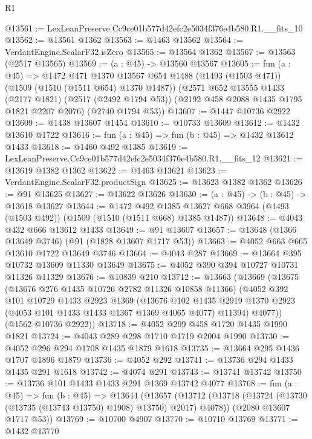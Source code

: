 \begin{lexlean}{R1}
\begin{coremodule}
@13561 := LexLeanPreserve.Cc9ce01b577d42efc2e5034f376e4b580.R1.__fits_10
@13562 := @13561 @1362
@13563 := @1463 @13562
@13564 := VerdantEngine.ScalarF32.isZero
@13565 := @13564 @1362
@13567 := @13563 (@2517 @13565)
@13569 := (a : @45) -> @13560 @13567
@13605 := fun (a : @45) =>
  @1472
    @471
    @1370
    @13567
    @654
    @1488
    (@1493 (@1503 @471))
    (@1509 (@1510 (@1511 @654) @1370 @1487))
    (@2571
      @652
      @13555
      @1433
      (@2177 @1821)
      (@2517 (@2492 @1794 @53))
      (@2192 @458 @2088 @1435 @1795 @1821 @2207 @2076)
      (@2740 @1794 @53))
@13607 := @1447 @10736 @2922
@13609 := @1438 @13607 @1454
@13610 := @10733 @13609
@13612 := @1432 @13610 @1722
@13616 := fun (a : @45) => fun (b : @45) => @1432 @13612 @1433
@13618 := @1460 @492 @1385
@13619 := LexLeanPreserve.Cc9ce01b577d42efc2e5034f376e4b580.R1.__fits_12
@13621 := @13619 @1382 @1362
@13622 := @1463 @13621
@13623 := VerdantEngine.ScalarF32.productSign
@13625 := @13623 @1382 @1362
@13626 := @91 @13625
@13627 := @13622 @13626
@13630 := (a : @45) -> (b : @45) -> @13618 @13627
@13644 := @1472
    @492
    @1385
    @13627
    @668
    @3964
    (@1493 (@1503 @492))
    (@1509 (@1510 (@1511 @668) @1385 @1487))
@13648 := @4043 @432 @666 @13612 @1433
@13649 := @91 @13607
@13657 := @13648 (@1366 @13649 @3746) (@91 (@1828 @13607 @1717 @53))
@13663 := @4052 @663 @665 @13610 @1722 @13649 @3746
@13664 := @4043 @287
@13669 := @13664 @395 @10732 @13609 @11330 @13649
@13675 := @4052 @390 @394 @10727 @10731 @11326 @11329
@13676 := @10839 @210
@13712 := @13663
    (@13669
      (@13675
        (@13676 @276 @1435 @10726 @2782 @11326 @10858 @11366)
        (@4052
          @392
          @101
          @10729
          @1433
          @2923
          @1369
          (@13676
            @102
            @1435
            @2919
            @1370
            @2923
            (@4053 @101 @1433 @1433 @1367 @1369 @4065 @4077)
            @11394)
          @4077))
      (@1562 @10736 @2922))
@13718 := @4052 @299 @458 @1720 @1435 @1990 @1821
@13724 := @4043 @289 @298 @1710 @1719 @2004 @1990
@13730 := @4052 @296 @294 @1708 @1435 @1879 @1618
@13735 := @13664 @295 @1436 @1707 @1896 @1879
@13736 := @4052 @292
@13741 := @13736 @294 @1433 @1435 @291 @1618
@13742 := @4074 @291
@13743 := @13741 @13742
@13750 := @13736 @101 @1433 @1433 @291 @1369 @13742 @4077
@13768 := fun (a : @45) =>
  fun (b : @45) =>
  @13644
    (@13657
      (@13712 (@13718 (@13724 (@13730 (@13735 (@13743 @13750) @1908) @13750) @2017) @4078))
      (@2080 @13607 @1717 @53))
@13769 := @10700 @4907
@13770 := @10710 @13769
@13771 := @1432 @13770

\end{coremodule}
\end{lexlean}
